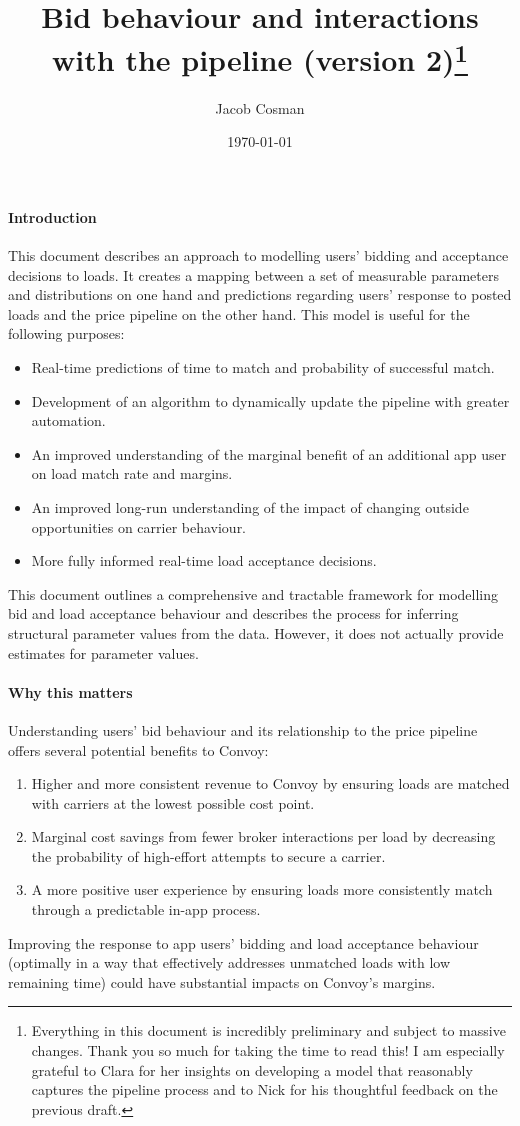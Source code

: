 \documentclass[12pt]{article}
\title{\vspace{-2em}Bid behaviour and interactions with the pipeline (version 2)\footnote{Everything in this document is incredibly preliminary and subject to massive changes. Thank you so much for taking the time to read this! I am especially grateful to Clara for her insights on developing a model that reasonably captures the pipeline process and to Nick for his thoughtful feedback on the previous draft.}}
\author{Jacob Cosman }
\date{\today}
\begin{document}
\maketitle
\onehalfspacing
\paragraph{Introduction}

This document describes an approach to modelling users' bidding and acceptance decisions to loads. It creates a mapping between a set of measurable parameters and distributions on one hand and predictions regarding users' response to posted loads and the price pipeline on the other hand. This model is useful for the following purposes:
\begin{itemize}
    \item Real-time predictions of time to match and probability of successful match.
    \item Development of an algorithm to dynamically update the pipeline with greater automation.
    \item An improved understanding of the marginal benefit of an additional app user on load match rate and margins.
    \item An improved long-run understanding of the impact of changing outside opportunities on carrier behaviour.
    \item More fully informed real-time load acceptance decisions.
\end{itemize}
This document outlines a comprehensive and tractable framework for modelling bid and load acceptance behaviour and describes the process for inferring structural parameter values from the data. However, it does not actually provide estimates for parameter values.

\paragraph{Why this matters}
Understanding users' bid behaviour and its relationship to the price pipeline offers several potential benefits to Convoy:
\begin{enumerate}
    \item Higher and more consistent revenue to Convoy by ensuring loads are matched with carriers at the lowest possible cost point.
    \item Marginal cost savings from fewer broker interactions per load by decreasing the probability of high-effort attempts to secure a carrier.
    \item A more positive user experience by ensuring loads more consistently match through a predictable in-app process.
\end{enumerate}
Improving the response to app users' bidding and load acceptance behaviour (optimally in a way that effectively addresses unmatched loads with low remaining time) could have substantial impacts on Convoy's margins.
\end{document}
